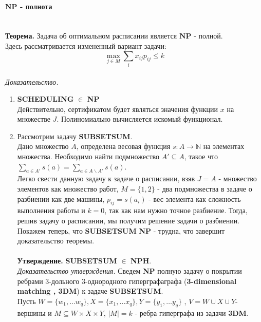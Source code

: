 \documentclass[10pt]{article}
\begin{document}
\paragraph{\Large{$\mathbf{NP}$ - полнота\\\\}}
\indent \textbf{Теорема.} Задача об оптимальном расписании является $\mathbf{NP}$ - полной. \\
Здесь рассматривается измененный вариант задачи:
\begin{equation}
     \max_{j \in M} \sum_{i} x_{ij} p_{ij} \leq k
\end{equation} \\
{\itshape Доказательство.}
\begin{enumerate}
    \item \textbf{SCHEDULING} $\in$ \textbf{NP} \\
    \indent Действительно, сертификатом будет являться значения функции $x$ на множестве $J$. Полиномиально вычисляется искомый функционал.
    \item Рассмотрим  задачу \textbf{SUBSETSUM}. \\
    Дано множество $A$, определена весовая функция $s : A \to \mathbb{N}$ на элементах множества. Необходимо найти подмножество
    $A'\subseteq A$, такое что $\sum_{a \in A'} s(a) = \sum_{a \in A\backslash A'} s(a)$. \\
    Легко свести данную задачу к задаче о расписании, взяв $J = A$ - множество элементов как множество работ, $M = \{1,2\}$ - два подмножества в задаче о разбиении как две машины, $p_{ij} = s(a_i)$ - вес элемента как сложность выполнения работы и $k = 0$, так как нам нужно точное разбиение. Тогда, решив задачу о расписании, мы получим решение задачи о разбиении. \\
    Покажем теперь, что \textbf{SUBSETSUM} \textbf{NP} - трудна, что завершит доказательство теоремы. \\ \\ 
    \textbf{Утверждение.} \textbf{SUBSETSUM} $\in$ \textbf{NPH}. \\
    {\itshape Доказательство утверждения.} Сведем \textbf{NP} полную задачу о покрытии ребрами 3-дольного 3-однородного гиперграфаграфа 
    (\textbf{3-dimensional matching , 3DM}) к задаче \textbf{SUBSETSUM}. \\ Пусть $W = \{w_1,\dots w_q\},X=\{x_1,\dots x_q\},Y=\{y_1,\dots y_q\}$ , $V = W \cup X \cup Y$- вершины и $M \subseteq W \times X \times Y$, $|M| = k$ - ребра гиперграфа из задачи \textbf{3DM}.\\

\end{enumerate}
\end{document}
